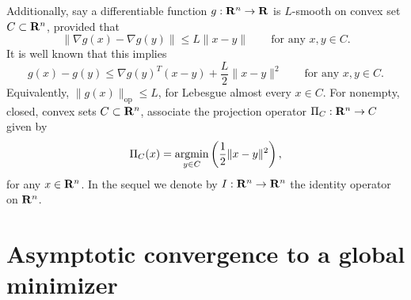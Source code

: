 \documentclass[11pt]{article}
\begin{document}
Additionally, say a differentiable function $g: \mathbf{R}^n \to \mathbf{R}$ is 
$L$-smooth on convex set $C \subset \mathbf{R}^n$, provided that 
\[
\|\nabla g(x) - \nabla g(y)\| \leq L \|x - y\| \qquad 
\text{for any $x, y \in C$}.
\]
It is well known that this implies 
\begin{equation}\label{ineq:smoothness}
g(x) - g(y) \leq  \nabla g(y)^T(x - y) + \frac{L}{2}\|x -y\|^2 \qquad 
\text{for any $x, y \in C$}.
\end{equation}
Equivalently, $\|g(x)\|_\mathrm{op} \leq L$, for Lebesgue almost every $x \in C$. For nonempty, closed, convex sets $C 
\subset \mathbf{R}^n$, associate the projection operator $\Pi_C: \mathbf{R}^n \to C$ given by 
\[
\Pi_C(x) = \mathop{\rm argmin}_{y \in C} \left( \frac12 \|x - y\|^2 \right), 
\]
for any $x \in \mathbf{R}^n$. In the sequel we denote by $I: \mathbf{R}^n \to \mathbf{R}^n$ the identity operator on $\mathbf{R}^n$.

\section{Asymptotic convergence to a global minimizer}\label{sec:prelims}
\end{document}
